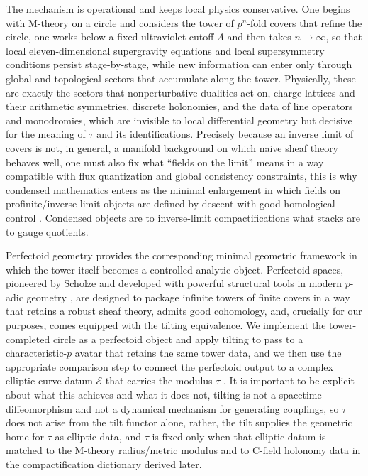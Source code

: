 \documentclass[11pt]{article}
\theoremstyle{remark}
\newcommand{\calE}{\mathcal{E}}
\begin{document}
The mechanism is operational and keeps local physics conservative. One begins with M-theory on a circle and considers the tower of \(p^{n}\)-fold covers that refine the circle, one works below a fixed ultraviolet cutoff \(\Lambda\) and then takes \(n\to\infty\), so that local eleven-dimensional supergravity equations and local supersymmetry conditions persist stage-by-stage, while new information can enter only through global and topological sectors that accumulate along the tower. Physically, these are exactly the sectors that nonperturbative dualities act on, charge lattices and their arithmetic symmetries, discrete holonomies, and the data of line operators and monodromies, which are invisible to local differential geometry but decisive for the meaning of \(\tau\) and its identifications. Precisely because an inverse limit of covers is not, in general, a manifold background on which naive sheaf theory behaves well, one must also fix what ``fields on the limit'' means in a way compatible with flux quantization and global consistency constraints, this is why condensed mathematics enters as the minimal enlargement in which fields on profinite/inverse-limit objects are defined by descent with good homological control \cite{ClausenScholze}. Condensed objects are to inverse-limit compactifications what stacks are to gauge quotients.

Perfectoid geometry provides the corresponding minimal geometric framework in which the tower itself becomes a controlled analytic object. Perfectoid spaces, pioneered by Scholze \cite{Scholze2012} and developed with powerful structural tools in modern \(p\)-adic geometry \cite{BhattScholze2019, KedlayaLiu2015}, are designed to package infinite towers of finite covers in a way that retains a robust sheaf theory, admits good cohomology, and, crucially for our purposes, comes equipped with the tilting equivalence. We implement the tower-completed circle as a perfectoid object and apply tilting to pass to a characteristic-\(p\) avatar that retains the same tower data, and we then use the appropriate comparison step to connect the perfectoid output to a complex elliptic-curve datum \(\calE\) that carries the modulus \(\tau\) \cite{FarguesScholze2018, ScholzeWeinstein2017}. It is important to be explicit about what this achieves and what it does not, tilting is not a spacetime diffeomorphism and not a dynamical mechanism for generating couplings, so \(\tau\) does not arise from the tilt functor alone, rather, the tilt supplies the geometric home for \(\tau\) as elliptic data, and \(\tau\) is fixed only when that elliptic datum is matched to the M-theory radius/metric modulus and to C-field holonomy data in the compactification dictionary derived later.
\end{document}
